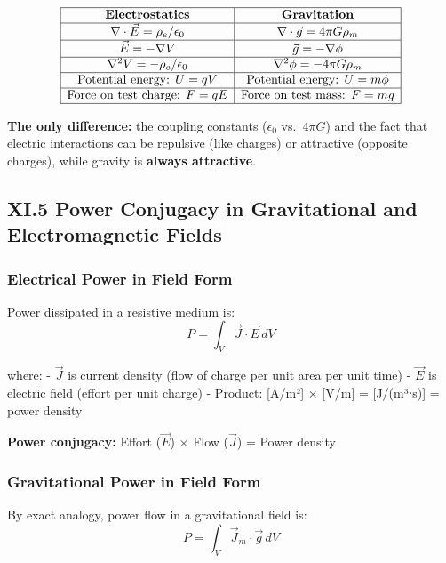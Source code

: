 \documentclass[
]{article}
\begin{document}
\[\begin{array}{|c|c|}
\hline
\textbf{Electrostatics} & \textbf{Gravitation} \\
\hline
\nabla \cdot \vec{E} = \rho_e/\epsilon_0 & \nabla \cdot \vec{g} = 4\pi G \rho_m \\
\hline
\vec{E} = -\nabla V & \vec{g} = -\nabla \phi \\
\hline
\nabla^2 V = -\rho_e/\epsilon_0 & \nabla^2 \phi = -4\pi G \rho_m \\
\hline
\text{Potential energy: } U = qV & \text{Potential energy: } U = m\phi \\
\hline
\text{Force on test charge: } F = qE & \text{Force on test mass: } F = mg \\
\hline
\end{array}\]

\textbf{The only difference:} the coupling constants (\(\epsilon_0\)
vs.~\(4\pi G\)) and the fact that electric interactions can be repulsive
(like charges) or attractive (opposite charges), while gravity is
\textbf{always attractive}.

\subsection{XI.5 Power Conjugacy in Gravitational and Electromagnetic
Fields}\label{xi.5-power-conjugacy-in-gravitational-and-electromagnetic-fields}

\subsubsection{Electrical Power in Field
Form}\label{electrical-power-in-field-form}

Power dissipated in a resistive medium is:
\[P = \int_V \vec{J} \cdot \vec{E} \, dV\]

where: - \(\vec{J}\) is current density (flow of charge per unit area
per unit time) - \(\vec{E}\) is electric field (effort per unit charge)
- Product: {[}A/m²{]} × {[}V/m{]} = {[}J/(m³⋅s){]} = power density

\textbf{Power conjugacy:} Effort (\(\vec{E}\)) × Flow (\(\vec{J}\)) =
Power density

\subsubsection{Gravitational Power in Field
Form}\label{gravitational-power-in-field-form}

By exact analogy, power flow in a gravitational field is:
\[P = \int_V \vec{J}_m \cdot \vec{g} \, dV\]
\end{document}
